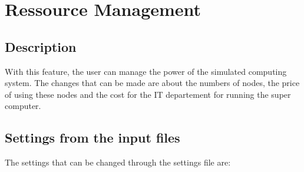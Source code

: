\documentclass{scrreprt}
\begin{document}
\section{Ressource Management}


\subsection{Description}
With this feature, the user can manage the power of the simulated computing system. The changes that can be made are about the numbers of nodes, the price of using these nodes and the cost for the IT departement for running the super computer. 
\subsection{Settings from the input files}
The settings that can be changed through the settings file are:
\end{document}
